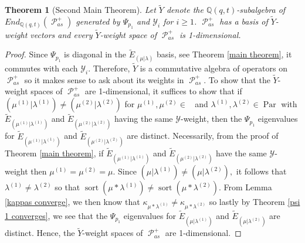 \documentclass[11pt]{article}
\newtheorem{thm}[theo]{Theorem}
\theoremstyle{definition}
\numberwithin{equation}{section}
\newcommand{\y}{{ \mathscr{Y} }}
\DeclareMathOperator{\sP}{\mathscr{P} }
\DeclareMathOperator{\sort}{sort}
\DeclareMathOperator{\Par}{\mathrm{Par}}
\DeclareMathOperator{\Compred}{\mathrm{Comp}^{\textit{red}}}
\begin{document}
\begin{thm}[Second Main Theorem]\label{second main theorem}
    Let $\widetilde{Y}$ denote the $\mathbb{Q}(q,t)$-subalgebra of $End_{\mathbb{Q}(q,t)}(\sP_{as}^{+})$ generated by $\Psi_{p_1}$ and $\y_i$ for $i \geq 1$. $\sP_{as}^{+}$ has a basis of $\widetilde{Y}$-weight vectors and every $\widetilde{Y}$-weight space of $\sP_{as}^{+}$ is 1-dimensional.
\end{thm}
\begin{proof}
Since $\Psi_{p_1}$ is diagonal in the $\widetilde{E}_{(\mu|\lambda)}$ basis, see Theorem \ref{main theorem}, it commutes with each $\y_i$. Therefore, $\widetilde{Y}$ is a commutative algebra of operators on $\sP_{as}^{+}$ so it makes sense to ask about its weights in $\sP_{as}^{+}$. To show that the $\widetilde{Y}$-weight spaces of $\sP_{as}^{+}$ are 1-dimensional, it suffices to show that if $(\mu^{(1)}|\lambda^{(1)}) \neq (\mu^{(2)}|\lambda^{(2)})$ for $\mu^{(1)},\mu^{(2)} \in \Compred$ and $\lambda^{(1)},\lambda^{(2)} \in \Par$ with $\widetilde{E}_{(\mu^{(1)}|\lambda^{(1)})}$ and $\widetilde{E}_{(\mu^{(2)}|\lambda^{(2)})}$ having the same $\y$-weight, then the $\Psi_{p_1}$ eigenvalues for $\widetilde{E}_{(\mu^{(1)}|\lambda^{(1)})}$ and $\widetilde{E}_{(\mu^{(2)}|\lambda^{(2)})}$ are distinct. Necessarily, from the proof of Theorem \ref{main theorem}, if $\widetilde{E}_{(\mu^{(1)}|\lambda^{(1)})}$ and $\widetilde{E}_{(\mu^{(2)}|\lambda^{(2)})}$ have the same $\y$-weight then $\mu^{(1)} = \mu^{(2)} = \mu$. Since $(\mu|\lambda^{(1)}) \neq (\mu|\lambda^{(2)}),$ it follows that $\lambda^{(1)} \neq \lambda^{(2)}$ so that $\sort(\mu*\lambda^{(1)}) \neq \sort(\mu*\lambda^{(2)} )$. From Lemma \ref{kappas converge}, we then know that $\kappa_{\mu*\lambda^{(1)}} \neq \kappa_{\mu*\lambda^{(2)}}$ so lastly by Theorem \ref{psi 1 converges}, we see that the $\Psi_{p_1}$ eigenvalues for $\widetilde{E}_{(\mu|\lambda^{(1)})}$ and $\widetilde{E}_{(\mu|\lambda^{(2)})}$ are distinct. Hence, the $\widetilde{Y}$-weight spaces of $\sP_{as}^{+}$ are 1-dimensional.
\end{proof}
\end{document}
